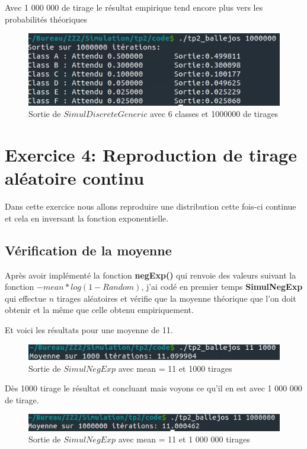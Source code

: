 \documentclass[12pt,french]{article} %
\begin{document}
Avec 1 000 000 de tirage le résultat empirique tend encore plus vers les probabilités théoriques

\begin{figure}[H]
	\centering
	\includegraphics[scale=0.8]{exo3-4.png}
	\caption{Sortie de $SimulDiscreteGeneric$ avec 6 classes et 1000000 de tirages}    
\end{figure}


\section{Exercice 4: Reproduction de tirage aléatoire continu}

Dans cette exercice nous allons reproduire une distribution cette fois-ci continue et cela en inversant la fonction exponentielle.

\subsection{Vérification de la moyenne}

Après avoir implémenté la fonction \textbf{negExp()} qui renvoie des valeurs suivant la fonction $-mean * log(1 - Random)$, j'ai codé en premier temps \textbf{SimulNegExp} qui effectue $n$ tirages aléatoires et vérifie que la moyenne théorique que l'on doit obtenir et la même que celle obtenu empiriquement.

Et voici les résultats pour une moyenne de 11.

\begin{figure}[H]
	\centering
	\includegraphics[scale=0.8]{exo4-1.png}
	\caption{Sortie de $SimulNegExp$ avec mean = 11 et 1000 tirages}    
\end{figure}

Dès 1000 tirage le résultat et concluant mais voyons ce qu'il en est avec 1 000 000 de tirage.

\begin{figure}[H]
	\centering
	\includegraphics[scale=0.8]{exo4-2.png}
	\caption{Sortie de $SimulNegExp$ avec mean = 11 et 1 000 000 tirages}    
\end{figure}
\end{document}
